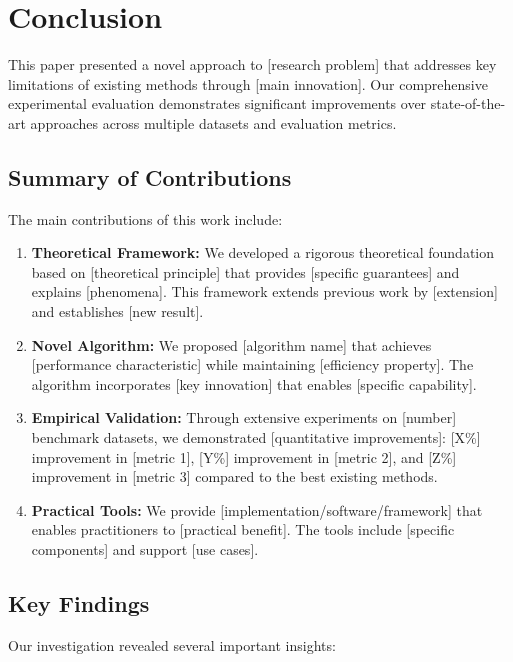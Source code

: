 \section{Conclusion}
\label{sec:conclusion}

This paper presented a novel approach to [research problem] that addresses key limitations of existing methods through [main innovation]. Our comprehensive experimental evaluation demonstrates significant improvements over state-of-the-art approaches across multiple datasets and evaluation metrics.

\subsection{Summary of Contributions}

The main contributions of this work include:

\begin{enumerate}
    \item \textbf{Theoretical Framework:} We developed a rigorous theoretical foundation based on [theoretical principle] that provides [specific guarantees] and explains [phenomena]. This framework extends previous work by [extension] and establishes [new result].
    
    \item \textbf{Novel Algorithm:} We proposed [algorithm name] that achieves [performance characteristic] while maintaining [efficiency property]. The algorithm incorporates [key innovation] that enables [specific capability].
    
    \item \textbf{Empirical Validation:} Through extensive experiments on [number] benchmark datasets, we demonstrated [quantitative improvements]: [X\%] improvement in [metric 1], [Y\%] improvement in [metric 2], and [Z\%] improvement in [metric 3] compared to the best existing methods.
    
    \item \textbf{Practical Tools:} We provide [implementation/software/framework] that enables practitioners to [practical benefit]. The tools include [specific components] and support [use cases].
\end{enumerate}

\subsection{Key Findings}

Our investigation revealed several important insights:

